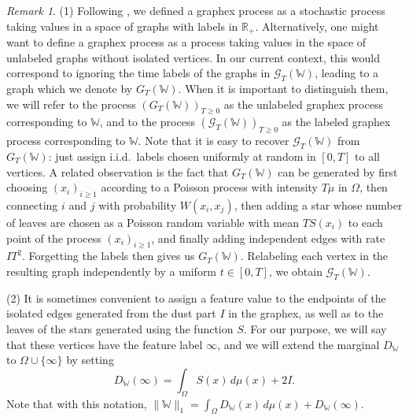 \documentclass{amsart}
\numberwithin{equation}{section}
\numberwithin{figure}{section}
\theoremstyle{definition}
\theoremstyle{remark}
\newtheorem{remark}[theorem]{Remark}
\newcommand{\RR}{\mathbb{R}}
\newcommand{\cW}{\mathbb{W}}
\newcommand{\cG}{\mathcal{G}}
\begin{document}
\begin{remark}\label{rem:graphex-process}
(1) Following \cite{BCCV17}, we defined a graphex process as a stochastic
process taking values in a space of graphs with labels in $\RR_+$.
Alternatively, one might want to define a graphex process as a process taking
values in the space of unlabeled graphs without isolated vertices. In our
current context, this would correspond to ignoring the time labels of the
graphs in $\cG_T(\cW)$, leading to a graph which we denote by $G_T(\cW)$.
When it is important to distinguish them, we will refer to the process
$(G_T(\cW))_{T\geq 0}$ as the unlabeled graphex process corresponding to
$\cW$, and to the process $(\cG_T(\cW))_{T\geq 0}$ as the labeled graphex
process corresponding to $\cW$. Note that it is easy to recover $\cG_T(\cW)$
from $G_T(\cW)$: just assign i.i.d.\ labels chosen uniformly at random in
$[0,T]$ to all vertices. A related observation is the fact that $G_T(\cW)$
can be generated by first choosing $(x_i)_{i\geq 1}$ according to a Poisson
process with intensity $T \mu$ in $\Omega$, then connecting $i$ and $j$ with
probability $W(x_i,x_j)$, then adding a star whose number of leaves are
chosen as a Poisson random variable with mean $TS(x_i)$ to each point of the
process $(x_i)_{i\geq 1}$, and finally adding independent edges with rate
$IT^2$. Forgetting the labels then gives us $G_T(\cW)$. Relabeling each
vertex in the resulting graph independently by a uniform $t\in [0,T]$, we
obtain $\cG_T(\cW)$.

(2) It is sometimes convenient to assign a feature value to the endpoints of
the isolated edges generated from the dust part $I$ in the graphex, as well
as to the leaves of the stars generated using the function $S$. For our
purpose, we will say that these vertices have the feature label $\infty$, and
we will extend the marginal $D_\cW$ to $\Omega\cup\{\infty\}$ by setting
\[D_\cW(\infty)=\int_\Omega S(x) \,d \mu(x) +2I.
\]
Note that with this notation, $ \|\cW\|_1=\int_\Omega D_\cW(x)\, d\mu(x)
+D_\cW(\infty)$.


\end{remark}
\end{document}
